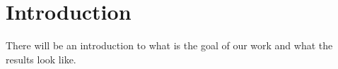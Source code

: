 \chapter*{Introduction} %




There will be an introduction to what is the goal of our work and what the results look like.